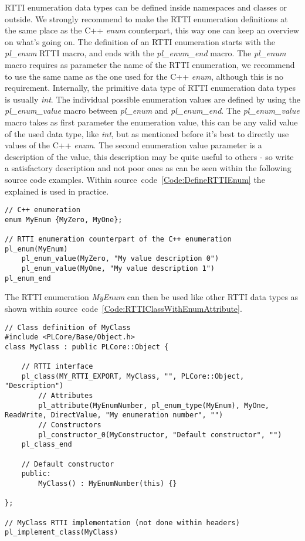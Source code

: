 \ac{RTTI} enumeration data types can be defined inside namespaces and classes or outside. We strongly recommend to make the \ac{RTTI} enumeration definitions at the same place as the C++ \emph{enum} counterpart, this way one can keep an overview on what's going on. The definition of an \ac{RTTI} enumeration starts with the \emph{pl\_enum} \ac{RTTI} macro, and ends with the \emph{pl\_enum\_end} macro. The \emph{pl\_enum} macro requires as parameter the name of the \ac{RTTI} enumeration, we recommend to use the same name as the one used for the C++ \emph{enum}, although this is no requirement. Internally, the primitive data type of \ac{RTTI} enumeration data types is usually \emph{int}. The individual possible enumeration values are defined by using the \emph{pl\_enum\_value} macro between \emph{pl\_enum} and \emph{pl\_enum\_end}. The \emph{pl\_enum\_value} macro takes as first parameter the enumeration value, this can be any valid value of the used data type, like \emph{int}, but as mentioned before it's best to directly use values of the C++ \emph{enum}. The second enumeration value parameter is a description of the value, this description may be quite useful to others - so write a satisfactory description and not poor ones as can be seen within the following source code examples. Within source~code~\ref{Code:DefineRTTIEnum} the explained is used in practice.
\begin{lstlisting}[float=htb,label=Code:DefineRTTIEnum,caption={Defining a new \ac{RTTI} enumeration}]
// C++ enumeration
enum MyEnum {MyZero, MyOne};

// RTTI enumeration counterpart of the C++ enumeration
pl_enum(MyEnum)
	pl_enum_value(MyZero, "My value description 0")
	pl_enum_value(MyOne, "My value description 1")
pl_enum_end
\end{lstlisting}
The \ac{RTTI} enumeration \emph{MyEnum} can then be used like other \ac{RTTI} data types as shown within source~code~\ref{Code:RTTIClassWithEnumAttribute}.
\begin{lstlisting}[label=Code:RTTIClassWithEnumAttribute,caption={Defining a new \ac{RTTI} class with an enumeration attribute}]
// Class definition of MyClass
#include <PLCore/Base/Object.h>
class MyClass : public PLCore::Object {

	// RTTI interface
	pl_class(MY_RTTI_EXPORT, MyClass, "", PLCore::Object, "Description")
		// Attributes
		pl_attribute(MyEnumNumber, pl_enum_type(MyEnum), MyOne, ReadWrite, DirectValue, "My enumeration number", "")
		// Constructors
		pl_constructor_0(MyConstructor, "Default constructor", "")
	pl_class_end

	// Default constructor
	public:
		MyClass() : MyEnumNumber(this) {}

};

// MyClass RTTI implementation (not done within headers)
pl_implement_class(MyClass)
\end{lstlisting}
